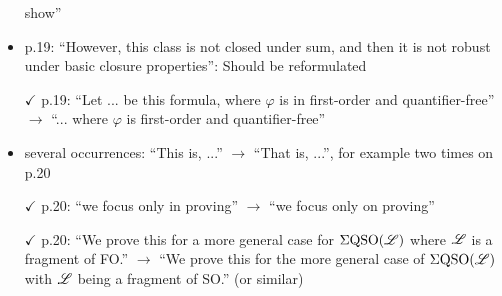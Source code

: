 \begin{itemize}
	show''
	\item p.19: ``However, this class is not closed under sum, and then it is not robust under basic
	closure properties'': Should be reformulated
	\item[$\checkmark$] p.19: ``Let ... be this formula, where $\varphi$ is in first-order and quantifier-free'' $\to$ ``... where $\varphi$ is
	first-order and quantifier-free''
	\item several occurrences: ``This is, ...'' $\to$ ``That is, ...'', for example two times on p.20
	\item[$\checkmark$] p.20: ``we focus only in proving'' $\to$ ``we focus only on proving''
	\item[$\checkmark$] p.20: ``We prove this for a more general case for $\Sigma{\rm QSO}(\mathscr{L})$ where $\mathscr{L}$ is a fragment of FO.''
	$\to$ ``We prove this for the more general case of $\Sigma{\rm QSO}(\mathscr{L})$ with $\mathscr{L}$ being a fragment of SO.''
	(or similar)
	

\end{itemize}
